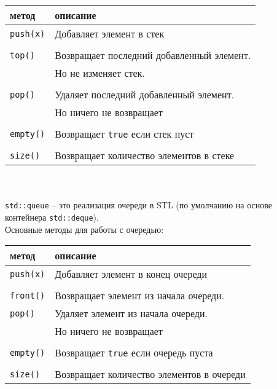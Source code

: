 \documentclass{article}
\begin{document}
\begin{tabular}{ l | l } 
 метод & описание \\ \hline
 \texttt{push(x)}  & Добавляет элемент в стек\\ \\\hline
 \texttt{top()}    & Возвращает последний добавленный элемент.  \\ 
                   & Но не изменяет стек. \\\\ \hline
 \texttt{pop()}    & Удаляет последний добавленный элемент. \\
                   & Но ничего не возвращает\\ \\ \hline
 \texttt{empty()}  & Возвращает \texttt{true} если стек пуст \\ \\\hline
 \texttt{size()}   & Возвращает количество элементов в стеке \\ \hline
\end{tabular}\\
\\

\texttt{std::queue} -- это реализация очереди в STL (по умолчанию на основе контейнера \texttt{std::deque}).\\

Основные методы для работы с очередью:

\begin{tabular}{ l | l }
 метод & описание \\ \hline
 \texttt{push(x)}  & Добавляет элемент в конец очереди\\ \\\hline
 \texttt{front()}  & Возвращает элемент из начала очереди.  \\  \hline
 \texttt{pop()}    & Удаляет элемент из начала очереди. \\
                   & Но ничего не возвращает\\ \\ \hline
 \texttt{empty()}  & Возвращает \texttt{true} если очередь пуста \\ \\\hline
 \texttt{size()}   & Возвращает количество элементов в очереди \\ \hline
\end{tabular}
\end{document}
